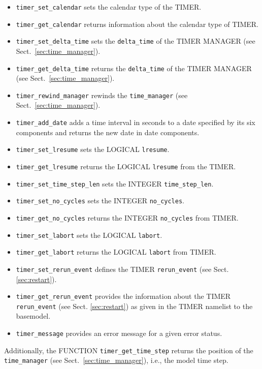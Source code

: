 \documentclass[twoside]{article}
\begin{document}
\begin{itemize}
\item \verb|timer_set_calendar| sets the calendar type of the TIMER.
\item \verb|timer_get_calendar| returns information about the calendar type of
      TIMER. 
\item \verb|timer_set_delta_time| sets the \verb|delta_time| of the TIMER 
      MANAGER (see Sect.~\ref{sec:time_manager}).
\item \verb|timer_get_delta_time| returns the \verb|delta_time| of the TIMER 
      MANAGER (see Sect.~\ref{sec:time_manager}).
\item \verb|timer_rewind_manager| rewinds the \verb|time_manager| 
      (see Sect.~\ref{sec:time_manager}).
\item \verb|timer_add_date| adds a time interval in seconds to a date
      specified by its six components and returns the new date in date
      components.
\item \verb|timer_set_lresume| sets the {\footnotesize LOGICAL} \verb|lresume|.
\item \verb|timer_get_lresume| returns the {\footnotesize LOGICAL} \verb|lresume| from the TIMER.
\item \verb|timer_set_time_step_len| sets the {\footnotesize INTEGER} \verb|time_step_len|.
\item \verb|timer_set_no_cycles|  sets the {\footnotesize INTEGER} \verb|no_cycles|.
\item \verb|timer_get_no_cycles| returns the {\footnotesize INTEGER} \verb|no_cycles| from TIMER.
\item \verb|timer_set_labort| sets the {\footnotesize LOGICAL} \verb|labort|.
\item \verb|timer_get_labort| returns the {\footnotesize LOGICAL} \verb|labort| from TIMER.
\item \verb|timer_set_rerun_event| defines the TIMER \verb|rerun_event| (see
 Sect. \ref{sec:restart}).
\item \verb|timer_get_rerun_event| provides the information about the TIMER
  \verb|rerun_event| (see Sect. \ref{sec:restart}) as given in the TIMER namelist
to the basemodel.
\item \verb|timer_message| provides an error message for a given error status.
\end{itemize}
%
Additionally, the FUNCTION \verb|timer_get_time_step| returns the position of 
the \verb|time_manager| (see Sect.~\ref{sec:time_manager}),
i.e., the model time step. 
\end{document}
